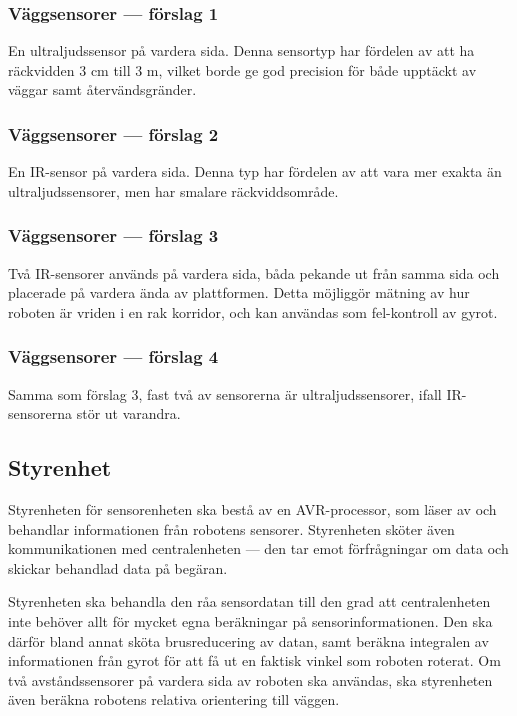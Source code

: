 \documentclass[a4paper,titlepage,12pt]{article}
\begin{document}
    \subsubsection{Väggsensorer --- förslag 1}
    
    En ultraljudssensor på vardera sida. Denna sensortyp har fördelen av att ha
    räckvidden 3 cm till 3 m, vilket borde ge god precision för både upptäckt
    av väggar samt återvändsgränder.

    \subsubsection{Väggsensorer --- förslag 2}

    En IR-sensor på vardera sida. Denna typ har fördelen av att vara mer exakta
    än ultraljudssensorer, men har smalare räckviddsområde.

    \subsubsection{Väggsensorer --- förslag 3}

    Två IR-sensorer används på vardera sida, båda pekande ut från samma sida och
    placerade på vardera ända av plattformen. Detta möjliggör mätning av hur
    roboten är vriden i en rak korridor, och kan användas som fel-kontroll av
    gyrot.

    \subsubsection{Väggsensorer --- förslag 4}

    Samma som förslag 3, fast två av sensorerna är ultraljudssensorer, ifall
    IR-sensorerna stör ut varandra.

    \subsection{Styrenhet}

    Styrenheten för sensorenheten ska bestå av en AVR-processor, som läser av och behandlar
    informationen från robotens sensorer. Styrenheten sköter även
    kommunikationen med centralenheten --- den tar emot förfrågningar om data och
    skickar behandlad data på begäran.

    Styrenheten ska behandla den råa sensordatan till den grad att
    centralenheten inte behöver allt för mycket egna beräkningar på
    sensorinformationen. Den ska därför bland annat sköta brusreducering av
    datan, samt beräkna integralen av informationen från gyrot för att få ut en
    faktisk vinkel som roboten roterat. Om två avståndssensorer på vardera sida
    av roboten ska användas, ska styrenheten även beräkna robotens relativa
    orientering till väggen.
    
\end{document}
